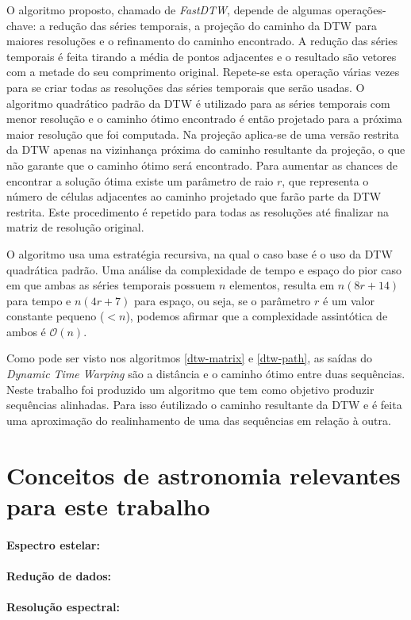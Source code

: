 O algoritmo proposto, chamado de \textit{FastDTW}, depende de algumas operações-chave: a redução das séries temporais, a projeção do caminho da DTW para maiores resoluções e o refinamento do caminho encontrado. A redução das séries temporais é feita tirando a média de pontos adjacentes e o resultado são vetores com a metade do seu comprimento original. Repete-se esta operação várias vezes para se criar todas as resoluções das séries temporais que serão usadas. O algoritmo quadrático padrão da DTW é utilizado para as séries temporais com menor resolução e o caminho ótimo encontrado é então projetado para a próxima maior resolução que foi computada. Na projeção aplica-se de uma versão restrita da DTW apenas na vizinhança próxima do caminho resultante da projeção, o que não garante que o caminho ótimo será encontrado. Para aumentar as chances de encontrar a solução ótima existe um parâmetro de raio $r$, que representa o número de células adjacentes ao caminho projetado que farão parte da DTW restrita. Este procedimento é repetido para todas as resoluções até finalizar na matriz de resolução original.

O algoritmo usa uma estratégia recursiva, na qual o caso base é o uso da DTW quadrática padrão. Uma análise da complexidade de tempo e espaço do pior caso em que ambas as séries temporais possuem $n$ elementos, resulta em $n(8r + 14)$ para tempo e $n(4r + 7)$ para espaço, ou seja, se o parâmetro $r$ é um valor constante pequeno ($<n$), podemos afirmar que a complexidade assintótica de ambos é $\mathcal{O}(n)$.

Como pode ser visto nos algoritmos \ref{dtw-matrix} e \ref{dtw-path}, as saídas do \textit{Dynamic Time Warping} são a distância e o caminho ótimo entre duas sequências. Neste trabalho foi produzido um algoritmo que tem como objetivo produzir sequências alinhadas. Para isso éutilizado o caminho resultante da DTW e é feita uma aproximação do realinhamento de uma das sequências em relação à outra. 


\section{Conceitos de astronomia relevantes para este trabalho}

\paragraph{Espectro estelar: }

\paragraph{Redução de dados: }

\paragraph{Resolução espectral: }